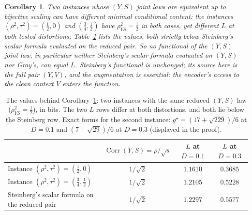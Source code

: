 \documentclass[11pt,onecolumn]{IEEEtran}
\newtheorem{corollary}[theorem]{Corollary}
\begin{document}
\begin{corollary}
\label{cor:notmarginal}
Two instances whose $(Y,S)$ joint laws are equivalent up to bijective
scaling can have different minimal conditional content: the instances
$(\rho^2,\tau^2)=(\tfrac12,0)$ and $(\tfrac34,\tfrac12)$ have
$\rho_{YS}^2=\tfrac12$ in both cases, yet different $L$ at both tested
distortions; Table~\ref{tab:notmarginal} lists the values, both
strictly below Steinberg's scalar formula evaluated on the reduced pair.
So no functional of the $(Y,S)$
joint law, in particular neither Steinberg's scalar formula evaluated on
$(Y,S)$ nor Gray's, can equal $L$. Steinberg's functional is unchanged;
its source here is the full pair $(Y,V)$, and the augmentation is
essential: the encoder's access to the clean context $V$ enters the
function.
\end{corollary}

\begin{table}[!t]
\caption{The values behind Corollary~\ref{cor:notmarginal}: two
instances with the same reduced $(Y,S)$ law ($\rho_{YS}^2=\tfrac12$),
in bits. The two $L$ rows differ at both distortions, and both lie
below the Steinberg row. Exact forms for the second instance:
$g^\star=(17+\sqrt{229})/6$ at $D=0.1$ and $(7+\sqrt{29})/6$ at
$D=0.3$ (displayed in the proof).}
\label{tab:notmarginal}
\centering
\footnotesize
\begin{tabular}{lccc}
\hline
 & $\operatorname{Corr}(Y,S)=\rho/\sqrt{s}$ & $L$ at $D=0.1$ & $L$ at $D=0.3$\\
\hline
Instance $(\rho^2,\tau^2)=(\tfrac12,0)$ & $1/\sqrt2$ & $1.1610$ & $0.3685$\\
Instance $(\rho^2,\tau^2)=(\tfrac34,\tfrac12)$ & $1/\sqrt2$ & $1.2105$ & $0.5228$\\
Steinberg's scalar formula on the reduced pair & $1/\sqrt2$ & $1.2297$ & $0.5577$\\
\hline
\end{tabular}
\end{table}
\end{document}
